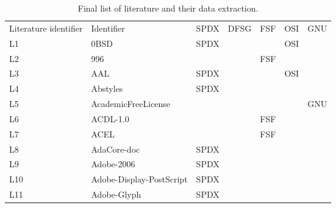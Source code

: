 
\begin{longtable}[h]{m{2cm} | m{7cm} | c | c | c | c | c}
  \caption{Final list of literature and their data extraction.} \label{table:appendix:c} \\
  \hline
  Literature identifier & Identifier & SPDX & DFSG & FSF & OSI & GNU \\
  L1 & 0BSD & SPDX &  &  & OSI &  \\
  L2 & 996 &  &  & FSF &  &  \\
  L3 & AAL & SPDX &  &  & OSI &  \\
  L4 & Abstyles & SPDX &  &  &  &  \\
  L5 & AcademicFreeLicense &  &  &  &  & GNU \\
  L6 & ACDL-1.0 &  &  & FSF &  &  \\
  L7 & ACEL &  &  & FSF &  &  \\
  L8 & AdaCore-doc & SPDX &  &  &  &  \\
  L9 & Adobe-2006 & SPDX &  &  &  &  \\
  L10 & Adobe-Display-PostScript & SPDX &  &  &  &  \\
  L11 & Adobe-Glyph & SPDX &  &  &  &  \\
\end{longtable}